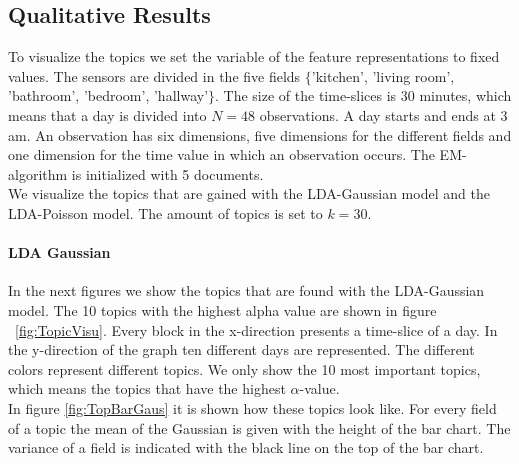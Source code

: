 \documentclass[11pt,a4paper]{article}
\begin{document}
\subsection{Qualitative Results}
To visualize the topics we set the variable of the feature representations to fixed values. The sensors are divided in the five fields $\{$'kitchen', 'living room', 'bathroom', 'bedroom', 'hallway'$\}$. The size of the time-slices is 30 minutes, which means that a day is divided into $N=48$ observations. A day starts and ends at 3 am. An observation has six dimensions, five dimensions for the different fields and one dimension for the time value in which an observation occurs. The EM-algorithm is initialized with 5 documents.\\
We visualize the topics that are gained with the LDA-Gaussian model and the LDA-Poisson model.
The amount of topics is set to $k=30$.
\paragraph{LDA Gaussian}
In the next figures we show the topics that are found with the LDA-Gaussian model. The 10 topics with the highest alpha value are shown in figure ~\ref{fig:TopicVisu}. Every block in the x-direction presents a time-slice of a day. In the y-direction of the graph ten different days are represented. The different colors represent different topics. We only show the 10 most important topics, which means the topics that have the highest $\alpha$-value.\\
In figure \ref{fig:TopBarGaus} it is shown how these topics look like. For every field of a topic the mean of the Gaussian is given with the height of the bar chart. The variance of a field is indicated with the black line on the top of the bar chart.
\end{document}

